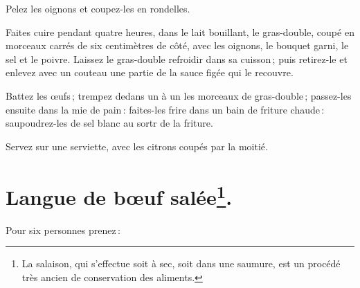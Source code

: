 Pelez les oignons et coupez-les en rondelles.

Faites cuire pendant quatre heures, dans le lait bouillant, le gras-double,
coupé en morceaux carrés de six centimètres de côté, avec les oignons, le
bouquet garni, le sel et le poivre. Laissez le gras-double refroidir dans sa
cuisson ; puis retirez-le et enlevez avec un couteau une partie de la sauce
figée qui le recouvre.

Battez les œufs ; trempez dedans un à un les morceaux de gras-double ;
passez-les ensuite dans la mie de pain : faites-les frire dans un bain de
friture chaude : saupoudrez-les de sel blanc au sortr de la friture.

Servez sur une serviette, avec les citrons coupés par la moitié.

\section*{\centering Langue de bœuf salée\footnote{La salaison, qui s'effectue soit à sec, soit
                              dans une saumure, est un procédé très ancien
                              de conservation des aliments.}.}

Pour six personnes prenez :

\medskip


